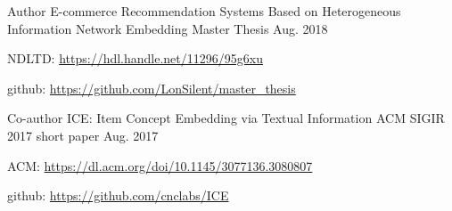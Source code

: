 

\begin{cventries}

	\cventry
	{Author} %
	{E-commerce Recommendation Systems Based on Heterogeneous Information Network Embedding} %
	{Master Thesis} %
	{Aug. 2018} %
	{
		\begin{cvitems} %
			\item {NDLTD: \url{https://hdl.handle.net/11296/95g6xu}}
			\item {github: \url{https://github.com/LonSilent/master_thesis}}
		\end{cvitems}
	}

	\cventry
	{Co-author} %
	{ICE: Item Concept Embedding via Textual Information} %
	{ACM SIGIR 2017 short paper} %
	{Aug. 2017} %
	{
		\begin{cvitems} %
			\item {ACM: \url{https://dl.acm.org/doi/10.1145/3077136.3080807}}
			\item {github: \url{https://github.com/cnclabs/ICE}}
		\end{cvitems}
	}

\end{cventries}
